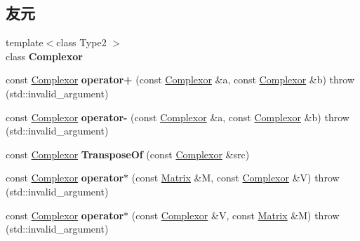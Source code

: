 \subsection*{友元}
\begin{DoxyCompactItemize}
\item 
\mbox{\label{classkerbal_1_1math_1_1_complexor_abd7746b9ea15657eb6358afb2252e6e9}} 
{\footnotesize template$<$class Type2 $>$ }\\class {\bfseries Complexor}
\item 
\mbox{\label{classkerbal_1_1math_1_1_complexor_a3374be202737b8b0006d5363982a1dde}} 
const \hyperlink{classkerbal_1_1math_1_1_complexor}{Complexor} {\bfseries operator+} (const \hyperlink{classkerbal_1_1math_1_1_complexor}{Complexor} \&a, const \hyperlink{classkerbal_1_1math_1_1_complexor}{Complexor} \&b)  throw (std\+::invalid\+\_\+argument)
\item 
\mbox{\label{classkerbal_1_1math_1_1_complexor_ac298c30dfde413eb3de67a25e841d2c3}} 
const \hyperlink{classkerbal_1_1math_1_1_complexor}{Complexor} {\bfseries operator-\/} (const \hyperlink{classkerbal_1_1math_1_1_complexor}{Complexor} \&a, const \hyperlink{classkerbal_1_1math_1_1_complexor}{Complexor} \&b)  throw (std\+::invalid\+\_\+argument)
\item 
\mbox{\label{classkerbal_1_1math_1_1_complexor_a440228f14de8e3ea32f55f2d308b4654}} 
const \hyperlink{classkerbal_1_1math_1_1_complexor}{Complexor} {\bfseries Transpose\+Of} (const \hyperlink{classkerbal_1_1math_1_1_complexor}{Complexor} \&src)
\item 
\mbox{\label{classkerbal_1_1math_1_1_complexor_a8cd1bc5d645237ca32e7113af6469f3e}} 
const \hyperlink{classkerbal_1_1math_1_1_complexor}{Complexor} {\bfseries operator$\ast$} (const \hyperlink{classkerbal_1_1math_1_1_matrix}{Matrix} \&M, const \hyperlink{classkerbal_1_1math_1_1_complexor}{Complexor} \&V)  throw (std\+::invalid\+\_\+argument)
\item 
\mbox{\label{classkerbal_1_1math_1_1_complexor_acfdf557ef1f1bf1ff3f73ac012356ee3}} 
const \hyperlink{classkerbal_1_1math_1_1_complexor}{Complexor} {\bfseries operator$\ast$} (const \hyperlink{classkerbal_1_1math_1_1_complexor}{Complexor} \&V, const \hyperlink{classkerbal_1_1math_1_1_matrix}{Matrix} \&M)  throw (std\+::invalid\+\_\+argument)

\end{DoxyCompactItemize}
